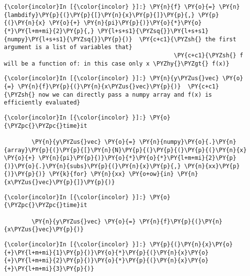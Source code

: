     \begin{Verbatim}[commandchars=\\\{\}]
{\color{incolor}In [{\color{incolor} }]:} \PY{n}{f} \PY{o}{=} \PY{n}{lambdify}\PY{p}{(}\PY{p}{[}\PY{n}{x}\PY{p}{]}\PY{p}{,} \PY{p}{(}\PY{n}{x} \PY{o}{+} \PY{n}{pi}\PY{p}{)}\PY{o}{*}\PY{o}{*}\PY{l+m+mi}{2}\PY{p}{,} \PY{l+s+s1}{\PYZsq{}}\PY{l+s+s1}{numpy}\PY{l+s+s1}{\PYZsq{}}\PY{p}{)}  \PY{c+c1}{\PYZsh{} the first argument is a list of variables that}
                                                 \PY{c+c1}{\PYZsh{} f will be a function of: in this case only x \PYZhy{}\PYZgt{} f(x)}
\end{Verbatim}

    \begin{Verbatim}[commandchars=\\\{\}]
{\color{incolor}In [{\color{incolor} }]:} \PY{n}{y\PYZus{}vec} \PY{o}{=} \PY{n}{f}\PY{p}{(}\PY{n}{x\PYZus{}vec}\PY{p}{)}  \PY{c+c1}{\PYZsh{} now we can directly pass a numpy array and f(x) is efficiently evaluated}
\end{Verbatim}



    \begin{Verbatim}[commandchars=\\\{\}]
{\color{incolor}In [{\color{incolor} }]:} \PY{o}{\PYZpc{}\PYZpc{}time}it
        
        \PY{n}{y\PYZus{}vec} \PY{o}{=} \PY{n}{numpy}\PY{o}{.}\PY{n}{array}\PY{p}{(}\PY{p}{[}\PY{n}{N}\PY{p}{(}\PY{p}{(}\PY{p}{(}\PY{n}{x} \PY{o}{+} \PY{n}{pi}\PY{p}{)}\PY{o}{*}\PY{o}{*}\PY{l+m+mi}{2}\PY{p}{)}\PY{o}{.}\PY{n}{subs}\PY{p}{(}\PY{n}{x}\PY{p}{,} \PY{n}{xx}\PY{p}{)}\PY{p}{)} \PY{k}{for} \PY{n}{xx} \PY{o+ow}{in} \PY{n}{x\PYZus{}vec}\PY{p}{]}\PY{p}{)}
\end{Verbatim}

    \begin{Verbatim}[commandchars=\\\{\}]
{\color{incolor}In [{\color{incolor} }]:} \PY{o}{\PYZpc{}\PYZpc{}time}it
        
        \PY{n}{y\PYZus{}vec} \PY{o}{=} \PY{n}{f}\PY{p}{(}\PY{n}{x\PYZus{}vec}\PY{p}{)}
\end{Verbatim}









    \begin{Verbatim}[commandchars=\\\{\}]
{\color{incolor}In [{\color{incolor} }]:} \PY{p}{(}\PY{n}{x}\PY{o}{+}\PY{l+m+mi}{1}\PY{p}{)}\PY{o}{*}\PY{p}{(}\PY{n}{x}\PY{o}{+}\PY{l+m+mi}{2}\PY{p}{)}\PY{o}{*}\PY{p}{(}\PY{n}{x}\PY{o}{+}\PY{l+m+mi}{3}\PY{p}{)}
\end{Verbatim}

